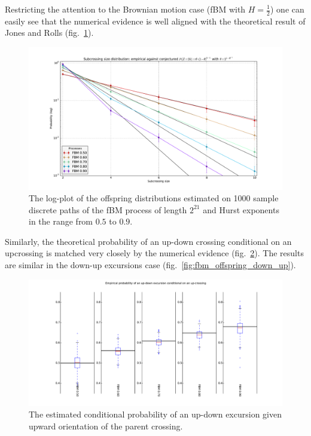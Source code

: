 \documentclass[a4paper]{article}
\begin{document}
Restricting the attention to the Brownian motion case (fBM with $H=\frac{1}{2}$)
one can easily see that the numerical evidence is well aligned with the theoretical
result of Jones and Rolls (fig.~\ref{fig:fbm_offspring_distribution}).
\begin{figure}[htb]\begin{center}
    \includegraphics[width=6in]{images/fbm_fig_01_med_1000-21}
    \caption{The log-plot of the offspring distributions estimated on 1000 sample discrete paths
    of the fBM process of length $2^{21}$ and Hurst exponents in the range from $0.5$ to $0.9$.}
\label{fig:fbm_offspring_distribution}
\end{center}\end{figure}
Similarly, the theoretical probability of an up-down crossing conditional on an upcrossing
is matched very closely by the numerical evidence (fig.~\ref{fig:fbm_offspring_up_down}).
The results are similar in the down-up excursions case (fig.~\ref{fig:fbm_offspring_down_up}).

\begin{figure}[htb]\begin{center}
    \includegraphics[width=6in]{images/fbm_fig_03_up-down_med_1000-21}
    \caption{The estimated conditional probability of an up-down excursion given upward
    orientation of the parent crossing.}
\label{fig:fbm_offspring_up_down}
\end{center}\end{figure}
\end{document}
